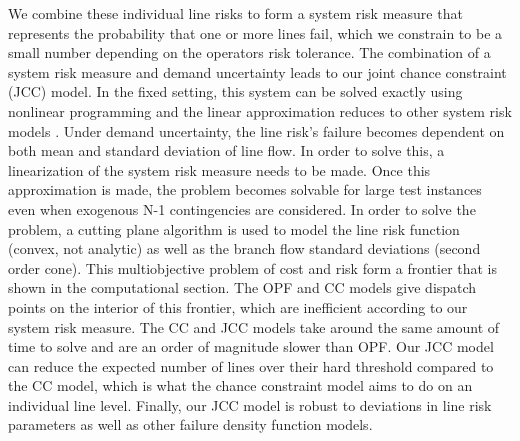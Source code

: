 We combine these individual line risks to form a system risk measure that represents the probability that one or more lines fail, which we constrain to be a small number depending on the operators risk tolerance.  The combination of a system risk measure and demand uncertainty leads to our joint chance constraint (JCC) model.  In the fixed setting, this  system can be solved exactly using nonlinear programming and the linear approximation reduces to other system risk models \cite{vrakopoulou_2013c,wang_2013}.  Under demand uncertainty, the line risk's failure becomes dependent on both mean and standard deviation of line flow. In order to solve this, a linearization of the system risk measure needs to be made.  Once this approximation is made, the problem becomes solvable for large test instances even when exogenous N-1 contingencies are considered.  In order to solve the problem, a cutting plane algorithm is used to model the line risk function (convex, not analytic) as well as the branch flow standard deviations (second order cone).  This multiobjective problem of cost and risk form a frontier that is shown in the computational section.  The OPF and CC models give dispatch points on the interior of this frontier, which are inefficient according to our system risk measure.  The CC and JCC models take around the same amount of time to solve and are an order of magnitude slower than OPF.  Our JCC model can reduce the expected number of lines over their hard threshold compared to the CC model, which is what the chance constraint model aims to do on an individual line level.  Finally, our JCC model is robust to deviations in line risk parameters as well as other failure density function models. 


